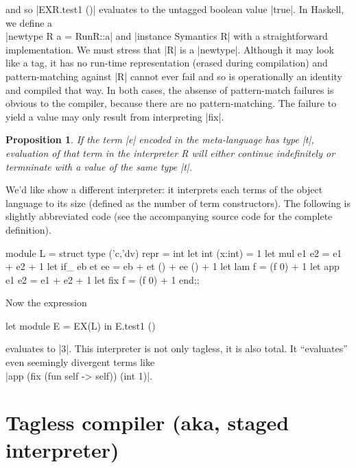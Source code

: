 \documentclass[preprint]{sigplanconf}
\newtheorem{prop}{Proposition}
\begin{document}
\noindent and so |EXR.test1 ()| evaluates to the untagged boolean value |true|.
In Haskell, we define a\\
|newtype R a = R{unR::a}| and |instance Symantics R|
with a straightforward implementation. We must stress that |R| is
a |newtype|. Although it may look like a tag, it has no run-time
representation (erased during compilation) and pattern-matching
against |R| cannot ever fail and so is operationally an identity and
compiled that way. In both cases, the absense of pattern-match
failures is obvious to the compiler, because there are no
pattern-matching. The failure to yield a value
may only result from interpreting |fix|.

\begin{prop}
If the term |e| encoded in the meta-language has type
|t|, evaluation of that term in the interpreter R will either continue
indefinitely or termninate with a value of the same type |t|.
\end{prop}

We'd like show a different interpreter: it interprets each terms of
the object language to its size (defined as the number of term
constructors). The following is slightly abbreviated code (see the
accompanying source code for the complete definition).
 
\begin{code}
module L = struct
  type ('c,'dv) repr = int
  let int (x:int)  = 1
  let mul e1 e2    = e1 + e2 + 1
  let if_ eb et ee = eb + et () + ee () + 1
  let lam f        = (f 0) + 1
  let app e1 e2    = e1 + e2 + 1
  let fix f        = (f 0) + 1
end;;
\end{code}

\noindent Now the expression
\begin{code}
  let module E = EX(L) in E.test1 ()
\end{code}
evaluates to |3|. This interpreter is not only tagless, it is also
total. It ``evaluates'' even seemingly divergent terms like\\
|app (fix (fun self -> self)) (int 1)|.

\begin{comment}
module EX1(S: Symantics) = struct
 open S
 let tfix () = app (fix (fun self -> self)) (int 1)
end;;
let module E =EX1(R) in E.tfix ();;
let module E =EX1(L) in E.tfix ();;
\end{comment}

\section{Tagless compiler (aka, staged interpreter)}\label{compiler}
\end{document}
